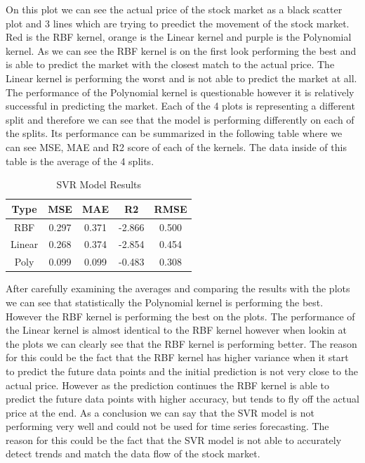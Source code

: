 \documentclass{imc-inf}
\begin{document}
	On this plot we can see the actual price of the stock market as a black scatter plot and 3 lines which are trying to preedict the movement of the stock market. Red is the RBF kernel, orange is the Linear kernel and purple is the Polynomial kernel.
	As we can see the RBF kernel is on the first look performing the best and is able to predict the market with the closest match to the actual price. The Linear kernel is performing the worst and is not able to predict the market at all.
	The performance of the Polynomial kernel is questionable however it is relatively successful in predicting the market. Each of the 4 plots is representing a different split and therefore we can see that the model is performing differently on each of the splits.
	Its performance can be summarized in the following table where we can see MSE, MAE and R2 score of each of the kernels. The data inside of this table is the average of the 4 splits.
	
	
	\begin{table}[h!]
		\centering
		\begin{tabular}{|c|c|c|c|c|}
			\hline
			\textbf{Type} & \textbf{MSE} & \textbf{MAE} & \textbf{R2} & \textbf{RMSE} \\ \hline
			RBF & 0.297 & 0.371 & -2.866 & 0.500 \\ \hline
			Linear & 0.268 & 0.374 & -2.854 & 0.454\\ \hline
			Poly & 0.099 & 0.099 & -0.483 &  0.308 \\ \hline
		\end{tabular}
		\caption{SVR Model Results}
		\label{tab:svr_model_results}
	\end{table}
	After carefully examining the averages and comparing the results with the plots we can see that statistically the Polynomial kernel is performing the best. However the RBF kernel is performing the best on the plots.
	The performance of the Linear kernel is almost identical to the RBF kernel however when lookin at the plots we can clearly see that the RBF kernel is performing better. The reason for this could be the fact that the RBF kernel has higher variance
	when it start to predict the future data points and the initial prediction is not very close to the actual price. However as the prediction continues the RBF kernel is able to predict the future data points with higher accuracy, 
	but tends to fly off the actual price at the end. As a conclusion we can say that the SVR model is not performing very well and could not be used for time series forecasting. The reason for this could be the fact that the SVR model is not able to 
	accurately detect trends and match the data flow of the stock market.
	
\end{document}

